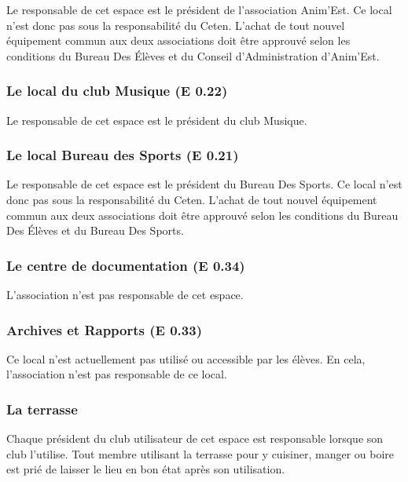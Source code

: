 \documentclass{article} %
\begin{document}
				Le responsable de cet espace est le président de l’association
				Anim’Est. Ce local n’est donc pas sous la responsabilité du
				Ceten. L’achat de tout nouvel équipement commun aux deux
				associations doit être approuvé selon les conditions du Bureau
				Des Élèves et du Conseil d'Administration d’Anim’Est.

			\subsubsection{Le local du club Musique (E 0.22)}

				Le responsable de cet espace est le président du club Musique.

			\subsubsection{Le local Bureau des Sports (E 0.21)}

				Le responsable de cet espace est le président du Bureau Des
				Sports. Ce local n’est donc pas sous la responsabilité du
				Ceten. L’achat de tout nouvel équipement commun aux deux
				associations doit être approuvé selon les conditions du Bureau
				Des Élèves et du Bureau Des Sports.

			\subsubsection{Le centre de documentation (E 0.34)}

				L’association n’est pas responsable de cet espace.

			\subsubsection{Archives et Rapports (E 0.33)}

				Ce local n’est actuellement pas utilisé ou accessible par les
				élèves. En cela, l’association n’est pas responsable de ce
				local.

			\subsubsection{La terrasse}

				Chaque président du club utilisateur de cet espace est
				responsable lorsque son club l’utilise. Tout membre utilisant
				la terrasse pour y cuisiner, manger ou boire est prié de
				laisser le lieu en bon état après son utilisation.
\end{document}
